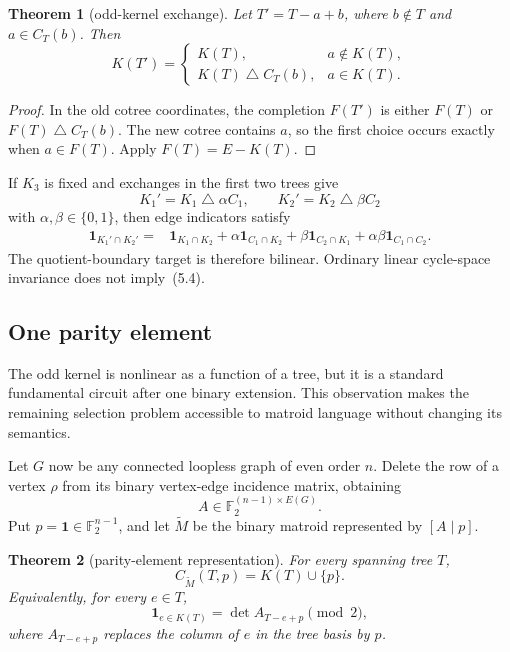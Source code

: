 \documentclass[11pt]{article}
\newtheorem{theorem}{Theorem}[section]
\theoremstyle{definition}
\theoremstyle{remark}
\newcommand{\F}{\mathbb F}
\newcommand{\symdiff}{\mathbin{\triangle}}
\newcommand{\1}{\mathbf 1}
\begin{document}
\begin{theorem}[odd-kernel exchange]\label{thm:exchange}
Let \(T'=T-a+b\), where \(b\notin T\) and
\(a\in C_T(b)\).  Then
\[
 K(T')=
 \begin{cases}
 K(T),&a\notin K(T),\\
 K(T)\symdiff C_T(b),&a\in K(T).
 \end{cases}                                             \tag{5.6}
\]
\end{theorem}

\begin{proof}
In the old cotree coordinates, the completion \(F(T')\) is either
\(F(T)\) or \(F(T)\symdiff C_T(b)\).  The new cotree contains \(a\), so
the first choice occurs exactly when \(a\in F(T)\).  Apply
\(F(T)=E-K(T)\).
\end{proof}

If \(K_3\) is fixed and exchanges in the first two trees give
\[
 K_1'=K_1\symdiff\alpha C_1,\qquad
 K_2'=K_2\symdiff\beta C_2
\]
with \(\alpha,\beta\in\{0,1\}\), then edge indicators satisfy
\begin{align}
 \1_{K_1'\cap K_2'}={}&\1_{K_1\cap K_2}
 +\alpha\1_{C_1\cap K_2}
 +\beta\1_{C_2\cap K_1}
 +\alpha\beta\1_{C_1\cap C_2}.                           \tag{5.7}
\end{align}
The quotient-boundary target is therefore bilinear.  Ordinary linear
cycle-space invariance does not imply~(5.4).

\subsection{One parity element}

The odd kernel is nonlinear as a function of a tree, but it is a standard
fundamental circuit after one binary extension.  This observation makes the
remaining selection problem accessible to matroid language without changing
its semantics.

Let \(G\) now be any connected loopless graph of even order \(n\).  Delete
the row of a vertex \(\rho\) from its binary vertex-edge incidence matrix,
obtaining
\[
 A\in\F_2^{(n-1)\times E(G)}.
\]
Put \(p=\1\in\F_2^{n-1}\), and let \(\widetilde M\) be the binary matroid
represented by \([A\mid p]\).

\begin{theorem}[parity-element representation]\label{thm:parity-element}
For every spanning tree \(T\),
\[
 C_{\widetilde M}(T,p)=K(T)\cup\{p\}.                    \tag{5.8}
\]
Equivalently, for every \(e\in T\),
\[
 \1_{e\in K(T)}=\det A_{T-e+p}\pmod2,                   \tag{5.9}
\]
where \(A_{T-e+p}\) replaces the column of \(e\) in the tree basis by
\(p\).
\end{theorem}
\end{document}

